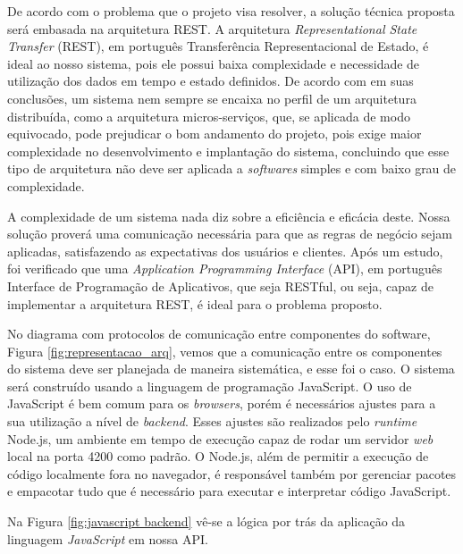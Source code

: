 \par De acordo com o problema que o projeto visa resolver, a solução técnica proposta será embasada na arquitetura REST. A arquitetura \textit{Representational State Transfer} (REST), em português Transferência Representacional de Estado, é ideal ao nosso sistema, pois ele possui baixa complexidade e necessidade de utilização dos dados em tempo e estado definidos. De acordo com \cite{microservice} em suas conclusões, um sistema nem sempre se encaixa no perfil de um arquitetura distribuída, como a arquitetura micros-serviços, que, se aplicada de modo equivocado, pode prejudicar o bom andamento do projeto, pois exige maior complexidade no desenvolvimento e implantação do sistema, concluindo que esse tipo de arquitetura não deve ser aplicada a \textit{softwares} simples e com baixo grau de complexidade. 

\par A complexidade de um sistema nada diz sobre a eficiência e eficácia deste. Nossa solução proverá uma comunicação necessária para que as regras de negócio sejam aplicadas, satisfazendo as expectativas dos usuários e clientes. Após um estudo, foi verificado que uma \textit{Application Programming Interface} (API), em português Interface de Programação de Aplicativos, que seja RESTful, ou seja, capaz de implementar a arquitetura REST, é ideal para o problema proposto. 

\par No diagrama com protocolos de comunicação entre componentes do software, Figura \ref{fig:representacao_arq}, vemos que a comunicação entre os componentes do sistema deve ser planejada de maneira sistemática, e esse foi o caso. O sistema será construído usando a linguagem de programação JavaScript. O uso de JavaScript é bem comum para os \textit{browsers}, porém é necessários ajustes para a sua utilização a nível de \textit{backend}. Esses ajustes são realizados pelo \textit{runtime} Node.js, um ambiente em tempo de execução capaz de rodar um servidor \textit{web} local na porta 4200 como padrão. O Node.js, além de permitir a execução de código localmente fora no navegador, é responsável também por gerenciar pacotes e empacotar tudo que é necessário para executar e interpretar código JavaScript.

\par Na Figura \ref{fig:javascript backend} vê-se a lógica por trás da aplicação da linguagem \textit{JavaScript} em nossa API.

